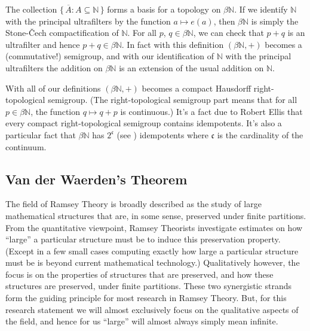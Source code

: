 \documentclass[12pt]{article}
\theoremstyle{plain}
\theoremstyle{definition}
\newcommand{\bbN}{\mathbb{N}}
\begin{document}
The collection $\{\, \overline{A} : A \subseteq \bbN \,\}$ forms a
basis for a topology on $\beta\bbN$.
If we identify $\bbN$ with the principal ultrafilters by the function
$a \mapsto e(a)$, then $\beta\bbN$ is simply the Stone-\v{C}ech
compactification of $\bbN$. 
For all $p$, $q \in \beta\bbN$, we can check that $p+q$ is an
ultrafilter and hence $p+q \in \beta\bbN$.
In fact with this definition $(\beta\bbN, +)$ becomes a (commutative!)
semigroup, and with our identification of $\bbN$ with the principal
ultrafilters the addition on $\beta\bbN$ is an extension of the usual
addition on $\bbN$. 

With all of our definitions $(\beta\bbN, +)$ becomes a compact
Hausdorff right-topological semigroup. 
(The right-topological semigroup part means that for all $p \in
\beta\bbN$, the function $q \mapsto q+p$ is continuous.)
It's a fact due to Robert Ellis that every compact right-topological
semigroup contains idempotents. 
It's also a particular fact that $\beta\bbN$ has $2^\mathfrak{c}$ (see
\cite[Theorem 6.44]{Hindman:1998fk}) idempotents
where $\mathfrak{c}$ is the cardinality of the continuum. 

\subsection{Van der Waerden's Theorem}
The field of Ramsey Theory is broadly described as the study of large
mathematical structures that are, in some sense, preserved under
finite partitions.
From the quantitative viewpoint, Ramsey Theorists investigate
estimates on how ``large'' a particular structure must be to induce
this preservation property.
(Except in a few small cases computing exactly how large a particular
structure must be is beyond current mathematical technology.)
Qualitatively however, the focus is on the properties of structures that are preserved, and how these structures are preserved, under finite partitions.
These two synergistic strands form the guiding principle for most
research in Ramsey Theory.
But, for this research statement we will almost exclusively focus on
the qualitative aspects of the field, and hence for us ``large'' will
almost always simply mean infinite.
\end{document}
